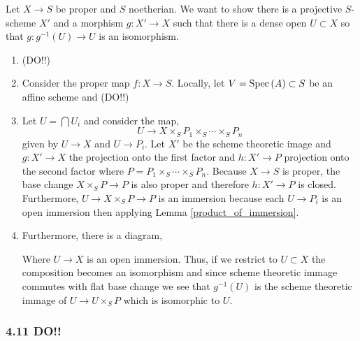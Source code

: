 \documentclass[12pt]{article}
\begin{document}
Let $X \to S$ be proper and $S$ noetherian. We want to show there is a projective $S$-scheme $X'$ and a morphism $g : X' \to X$ such that there is a dense open $U \subset X$ so that $g : g^{-1}(U) \to U$ is an isomorphism.

\begin{enumerate}
\item (DO!!)

\item Consider the proper map $f : X \to S$. Locally, let $V = \mathrm{Spec}\left( A \right) \subset S$ be an affine scheme and (DO!!)

\item Let $U = \bigcap U_i$ and consider the map,
\[ U \to X \times_S P_1 \times_S \cdots \times_S P_n \]
given by $U \to X$ and $U \to P_i$. Let $X'$ be the scheme theoretic image and $g : X' \to X$ the projection onto the first factor and $h : X' \to P$ projection onto the second factor where $P = P_1 \times_S \cdots \times_S P_n$. Because $X \to S$ is proper, the base change $X \times_S P \to P$ is also proper and therefore $h : X' \to P$ is closed. Furthermore, $U \to X \times_S P \to P$ is an immersion because each $U \to P_i$ is an open immersion then applying Lemma \ref{product_of_immersion}.  

\item Furthermore, there is a diagram,
\begin{center}
\end{center}
Where $U \to X$ is an open immersion. Thus, if we restrict to $U \subset X$ the composition becomes an isomorphism and since scheme theoretic immage commutes with flat base change we see that $g^{-1}(U)$ is the scheme theoretic immage of $U \to U \times_S P$ which is isomorphic to $U$. 
\end{enumerate}

\subsubsection{4.11 DO!!}
\end{document}
